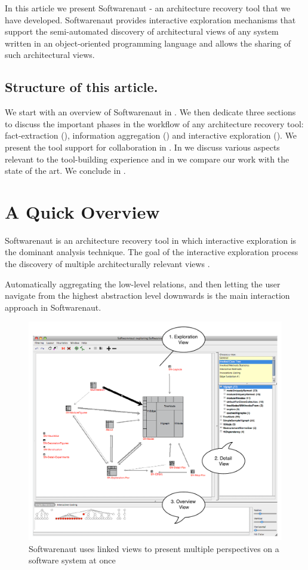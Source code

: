\documentclass[preprint,12pt]{elsarticle}
\begin{document}
In this article we present Softwarenaut - an architecture recovery tool that we have developed. Softwarenaut provides interactive exploration mechanisms that support the semi-automated discovery of architectural views of any system written in an object-oriented programming language and allows the sharing of such architectural views. 

\subsection*{Structure of this article.} We start with an overview of Softwarenaut in . We then dedicate three sections to discuss the important phases in the workflow of any architecture recovery tool: fact-extraction (), information aggregation () and interactive exploration (). We present the tool support for collaboration in . In  we discuss various aspects relevant to the tool-building experience and in  we compare our work with the state of the art. We conclude in .



\newpage
\section {A Quick Overview}
\label{sec:over}

Softwarenaut is an architecture recovery tool in which interactive exploration is the dominant analysis technique. The goal of the interactive exploration process the discovery of multiple architecturally relevant views \cite{lungu-packages}.

Automatically aggregating the low-level relations, and then letting the user navigate from the highest abstraction level downwards is the main interaction approach in Softwarenaut. 

\begin{figure}[h]
\begin{center}
\includegraphics[width=0.8\linewidth]{images/SnautOnSnaut}
\caption{Softwarenaut uses linked views to present multiple perspectives on a software system at once}
\end{center}
\end{figure}
\end{document}
